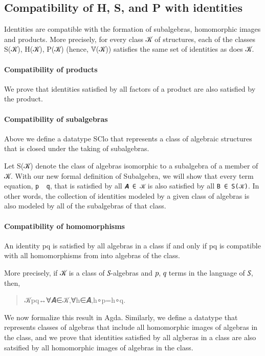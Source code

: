 \documentclass[a4paper,USenglish,cleveref,autoref,thm-restate]{lipics-v2019}
\begin{document}
\subsection{Compatibility of H, S, and P with identities}\label{sec:compatibility-of-identities}
Identities are compatible with the formation of subalgebras, homomorphic images and products. More precisely, for every class 𝒦 of structures, each of the classes S(𝒦), H(𝒦), P(𝒦) (hence, 𝕍(𝒦)) satisfies the same set of identities as does 𝒦.

\paragraph*{Compatibility of products}
We prove that identities satisfied by all factors of a product are also satisfied by the product.
\begin{code}\end{code}

\paragraph*{Compatibility of subalgebras}
Above we define a datatype SClo that represents a class of algebraic structures that is closed under the taking of subalgebras.

Let S(𝒦) denote the class of algebras isomorphic to a subalgebra of a member of 𝒦. With our new formal definition of Subalgebra, we will show that every term equation, \texttt{p\ \Aapprox \ q}, that is satisfied by all \texttt{𝑨\ ∈\ 𝒦} is also satisfied by all \texttt{B\ ∈\ S(𝒦)}. In other words, the collection of identities modeled by a given class of algebras is also modeled by all of the subalgebras of that class.
\begin{code}\end{code}

\paragraph*{Compatibility of homomorphisms}
An identity \AB p\AS \Aapprox\AS\AB q is satisfied by all algebras in a class if and only if \AB p\AS \Aapprox\AS\AB q is compatible with all homomorphisms from \TX into algebras of the class.

More precisely, if \AB 𝒦 is a class of \AB 𝑆-algebras and \AB 𝑝, \AB 𝑞 terms in the language of \AB 𝑆, then,
\begin{quote}
\AB 𝒦\AS\Amodels\AS\AB p\AS\Aapprox\AS\AB  q\AS\AS ↔\AS\AS\ASy ∀\AS\AB 𝑨\AS\ASy ∈\AS\AB 𝒦\AS\ASy ,\AS\ASy ∀\AS\AB h\AS\ASy ∈\AS{}\AS\TX\AS \AB 𝑨\AS\ASy ,\AB h\AS\ASy ∘\AS\termTX p\AS\ASy =\AS\AB h\AS\ASy ∘\AS\termTX q.
\end{quote}
We now formalize this result in Agda. Similarly, we define a datatype that represents classes of algebras that include all homomorphic images of algebras in the class, and we prove that identities satisfied by all algberas in a class are also satsified by all homomorphic images of algebras in the class.
\begin{code}\end{code}
\end{document}
